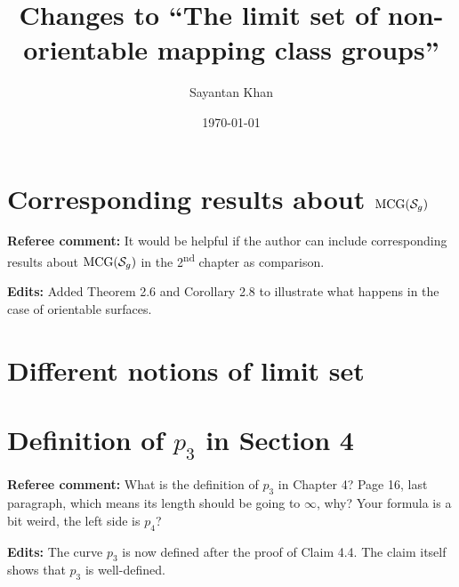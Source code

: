 \documentclass[12pt, reqno]{amsart}
\title{Changes to ``The limit set of non-orientable mapping class groups''}
\author{Sayantan Khan}
\date{\today}
\begin{document}
\maketitle

\section{Corresponding results about $\mathrm{MCG}(\mathcal{S}_g)$}
\label{sec:corr-results-about}

\textbf{Referee comment:} It would be helpful if the author can include corresponding results about $\mathrm{MCG}(\mathcal{S}_g)$ in the 2\textsuperscript{nd} chapter as comparison.

\textbf{Edits:} Added Theorem 2.6 and Corollary 2.8 to illustrate what happens in the case of orientable surfaces.

\section{Different notions of limit set}
\label{sec:diff-noti-limit}

\section{Definition of $p_3$ in Section 4}
\label{sec:defin-p_3-sect}

\textbf{Referee comment:} What is the definition of $p_3$ in Chapter 4? Page 16, last paragraph, which means its length should be going to $\infty$, why? Your formula is a bit weird, the left side is $p_4$?

\textbf{Edits:} The curve $p_3$ is now defined after the proof of Claim 4.4. The claim itself shows that $p_3$ is well-defined.
\end{document}
